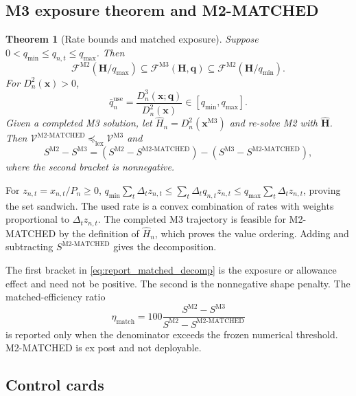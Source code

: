 \documentclass[10pt,journal,onecolumn]{IEEEtran}
\newtheorem{theorem}{Theorem}[section]
\newcommand{\Mtwo}{\ensuremath{\mathrm{M2}}}
\newcommand{\Mthree}{\ensuremath{\mathrm{M3}}}
\newcommand{\MtwoMatched}{\ensuremath{\mathrm{M2\text{-}MATCHED}}}
\newcommand{\lexleq}{\preceq_{\mathrm{lex}}}
\begin{document}
\subsection{M3 exposure theorem and M2-MATCHED}

\begin{theorem}[Rate bounds and matched exposure]
Suppose $0<q_{\min}\leq q_{n,t}\leq q_{\max}$. Then
\begin{equation}
\mathcal F^{\Mtwo}(\bm H/q_{\max})
\subseteq\mathcal F^{\Mthree}(\bm H,\bm q)
\subseteq\mathcal F^{\Mtwo}(\bm H/q_{\min}).
\label{eq:report_m3_sandwich}
\end{equation}
For $D_n^2(\bm x)>0$,
\begin{equation}
\bar q_n^{\mathrm{use}}
=\frac{D_n^3(\bm x;\bm q)}{D_n^2(\bm x)}
\in[q_{\min},q_{\max}].
\end{equation}
Given a completed M3 solution, let
$\widehat H_n=D_n^2(\bm x^{\Mthree})$ and re-solve M2 with
$\widehat{\bm H}$. Then
$\mathcal V^{\MtwoMatched}\lexleq\mathcal V^{\Mthree}$ and
\begin{equation}
S^{\Mtwo}-S^{\Mthree}
=\left(S^{\Mtwo}-S^{\MtwoMatched}\right)
-\left(S^{\Mthree}-S^{\MtwoMatched}\right),
\label{eq:report_matched_decomp}
\end{equation}
where the second bracket is nonnegative.
\end{theorem}

\begin{IEEEproof}
For $z_{n,t}=x_{n,t}/P_n\geq0$,
$q_{\min}\sum_t\Delta_tz_{n,t}
\leq\sum_t\Delta_tq_{n,t}z_{n,t}
\leq q_{\max}\sum_t\Delta_tz_{n,t}$, proving the set sandwich. The used rate
is a convex combination of rates with weights proportional to
$\Delta_tz_{n,t}$. The completed M3 trajectory is feasible for M2-MATCHED by
the definition of $\widehat H_n$, which proves the value ordering. Adding and
subtracting $S^{\MtwoMatched}$ gives the decomposition.
\end{IEEEproof}

The first bracket in \eqref{eq:report_matched_decomp} is the exposure or
allowance effect and need not be positive. The second is the nonnegative shape
penalty. The matched-efficiency ratio
\begin{equation}
\eta_{\mathrm{match}}
=100\frac{S^{\Mtwo}-S^{\Mthree}}
{S^{\Mtwo}-S^{\MtwoMatched}}
\end{equation}
is reported only when the denominator exceeds the frozen numerical threshold.
M2-MATCHED is ex post and not deployable.

\subsection{Control cards}
\end{document}

